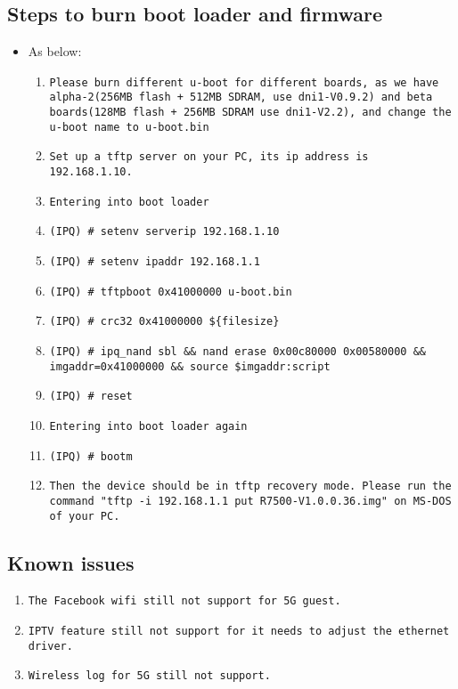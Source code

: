 \documentclass[12pt]{report}
\begin{document}
    \subsection{Steps to burn boot loader and firmware}
    \begin{itemize}
    \item As below:
            \begin{enumerate}
	    	\item \texttt{Please burn different u-boot for different boards, as we have alpha-2(256MB flash + 512MB SDRAM, use dni1-V0.9.2) and beta boards(128MB flash + 256MB SDRAM use dni1-V2.2), and change the u-boot name to u-boot.bin}
		\item \texttt{Set up a tftp server on your PC, its ip address is 192.168.1.10.}
		\item \texttt{Entering into boot loader}
		\item \texttt{(IPQ) \# setenv serverip 192.168.1.10}
		\item \texttt{(IPQ) \# setenv ipaddr 192.168.1.1}
		\item \texttt{(IPQ) \# tftpboot 0x41000000 u-boot.bin}
		\item \texttt{(IPQ) \# crc32 0x41000000 \$\{filesize\}}
		\item \texttt{(IPQ) \# ipq\_nand sbl \&\& nand erase 0x00c80000 0x00580000 \&\& imgaddr=0x41000000 \&\& source \$imgaddr:script}
		\item \texttt{(IPQ) \# reset}
		\item \texttt{Entering into boot loader again}
		\item \texttt{(IPQ) \# bootm}
		\item \texttt{Then the device should be in tftp recovery mode. Please run the command "tftp -i 192.168.1.1 put R7500-V1.0.0.36.img" on MS-DOS of your PC.}
            \end{enumerate}
    \end{itemize}

\subsection{Known issues}
            \begin{enumerate}
		\item \texttt{The Facebook wifi still not support for 5G guest.}
		\item \texttt{IPTV feature still not support for it needs to adjust the ethernet driver.}
		\item \texttt{Wireless log for 5G still not support.}
            \end{enumerate}
\end{document}
